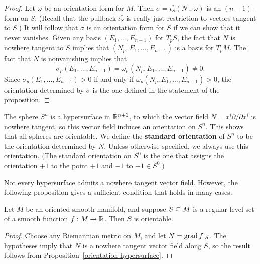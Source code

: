 \begin{proof}
Let $\omega$ be an orientation form for $M$. Then $\sigma=\iota^*_S(N\intprod\omega)$ is an $(n-1)$-form on $S$. (Recall that the pullback 	$\iota_S^*$ is really just restriction to vectors tangent to $S$.) It will follow that $\sigma$ is an orientation form for $S$ if we can show that it never vanishes. Given any basis $(E_1,\dots,E_{n-1})$ for $T_pS$, the fact that $N$ is nowhere tangent to $S$ implies that $(N_p,E_1,\dots,E_{n-1})$ is a basis for $T_pM$. The fact that $N$ is nonvanishing
implies that
\[\sigma_p(E_1,\dots,E_{n-1})=\omega_p(N_p,E_1,\dots,E_{n-1})\neq 0.\]
Since $\sigma_p(E_1,\dots,E_{n-1})>0$ if and only if $\omega_p(N_p,E_1,\dots,E_{n-1})>0$, the orientation determined by $\sigma$ is the one defined in the statement of the proposition.
\end{proof}
\begin{example}
The sphere $S^n$ is a hypersurface in $\mathbb{R}^{n+1}$, to which the vector field $N=x^i\partial/\partial x^i$ is nowhere tangent, so this vector field induces an orientation on $S^n$. This shows that all spheres are orientable. We define the \textbf{standard orientation} of $S^n$ to be the orientation determined by $N$. Unless otherwise specified, we always use this orientation. $($The standard orientation on $S^0$ is the one that assigns the orientation $+1$ to the point $+1$ and $-1$ to $-1\in S^0$.$)$
\end{example}
Not every hypersurface admits a nowhere tangent vector field. However, the following proposition gives a sufficient condition that holds in many cases.
\begin{proposition}
Let $M$ be an oriented smooth manifold, and suppose $S\subseteq M$ is a regular level set of a smooth function $f:M\to\mathbb{R}$. Then $S$ is orientable.
\end{proposition}
\begin{proof}
Choose any Riemannian metric on $M$, and let $N=\mathrm{grad}\, f|_S$. The hypotheses imply that $N$ is a nowhere tangent vector field along $S$, so the result follows from Proposition~\ref{orientation hypersurface}.
\end{proof}
